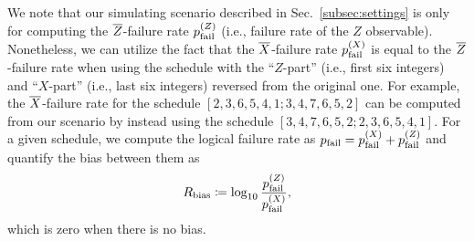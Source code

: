 \documentclass[a4paper,twocolumn,11pt,accepted=2025-01-21]{quantumarticle}
\theoremstyle{definition}
\theoremstyle{definition}
\theoremstyle{definition}
\begin{document}
We note that our simulating scenario described in Sec.~\ref{subsec:settings} is only for computing the $\overline{Z}$-failure rate $p_{\mathrm{fail}}^{(Z)}$ (i.e., failure rate of the $Z$ observable).
Nonetheless, we can utilize the fact that the $\overline{X}$-failure rate $p_{\mathrm{fail}}^{(X)}$ is equal to the $\overline{Z}$-failure rate when using the \cnot schedule with the ``$Z$-part'' (i.e., first six integers) and ``$X$-part'' (i.e., last six integers) reversed from the original one.
For example, the $\overline{X}$-failure rate for the schedule $[2, 3, 6, 5, 4, 1; 3, 4, 7, 6, 5, 2]$ can be computed from our scenario by instead using the schedule $[3, 4, 7, 6, 5, 2; 2, 3, 6, 5, 4, 1]$.
For a given \cnot schedule, we compute the logical failure rate as $p_{\mathrm{fail}} = p_{\mathrm{fail}}^{(X)} + p_{\mathrm{fail}}^{(Z)}$ and quantify the bias between them as
\begin{align}
    R_{\mathrm{bias}} \coloneqq \log_{10} \frac{p_\mathrm{fail}^{(Z)}}{p_\mathrm{fail}^{(X)}},
    \label{eq:bias_coeff}
\end{align}
which is zero when there is no bias.
\end{document}
